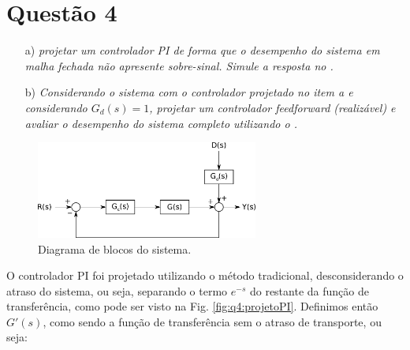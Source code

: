 

  \chapter*{Questão 4}

\begin{itemize}
    \item[a)] {\it projetar um controlador PI de forma que o desempenho do
              sistema em malha fechada não apresente sobre-sinal. Simule a 
              resposta no \Matlab.}
    \item[b)] {\it Considerando o sistema com o controlador projetado no item a
              e considerando $G_d(s) = 1$, projetar um controlador feedforward 
              (realizável) e avaliar o desempenho do sistema completo utilizando
              o \Matlab.}
\end{itemize}

\begin{figure}[H]
\centering
    \includegraphics[width=0.65\textwidth]{imgs/questao4/sistema}
    \caption{Diagrama de blocos do sistema.}
    \label{fig:q4:sist}
\end{figure}

\vspace{0.5cm}


\vspace{0.25cm}

O controlador PI foi projetado utilizando o método tradicional, desconsiderando
o atraso do sistema, ou seja, separando o termo $e^{-s}$ do restante da função
de transferência, como pode ser visto na Fig. \ref{fig:q4:projetoPI}.
Definimos então $G'(s)$, como sendo a função de transferência sem o atraso de
transporte, ou seja:

